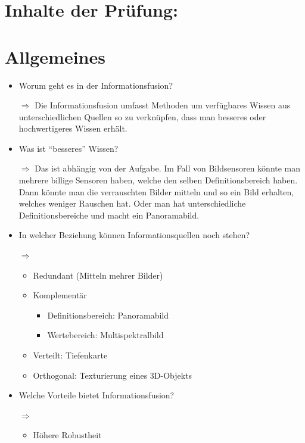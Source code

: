 \documentclass[a4paper]{article}
\begin{document}
\clearpage

\section*{Inhalte der Prüfung:}


    \section{Allgemeines}
    \begin{itemize}
        \item Worum geht es in der Informationsfusion?
        \item[$\Rightarrow$] Die Informationsfusion umfasst Methoden um verfügbares Wissen aus unterschiedlichen Quellen so zu verknüpfen, dass man besseres oder hochwertigeres Wissen erhält.
        \item Was ist \enquote{besseres} Wissen?
        \item[$\Rightarrow$] Das ist abhängig von der Aufgabe. Im Fall von
                             Bildsensoren könnte man mehrere billige Sensoren haben, welche den selben Definitionsbereich haben. Dann könnte man die verrauschten Bilder mitteln und so ein Bild erhalten, welches weniger Rauschen hat. Oder man hat unterschiedliche Definitionsbereiche und macht ein Panoramabild.
        \item In welcher Beziehung können Informationsquellen noch stehen?
        \item[$\Rightarrow$]
        \begin{itemize}
             \item Redundant (Mitteln mehrer Bilder)
             \item Komplementär
             \begin{itemize}
                 \item Definitionsbereich: Panoramabild
                 \item Wertebereich: Multispektralbild
             \end{itemize}
             \item Verteilt: Tiefenkarte
             \item Orthogonal: Texturierung eines 3D-Objekts
         \end{itemize}
         \item Welche Vorteile bietet Informationsfusion?
         \item[$\Rightarrow$]
         \begin{itemize}
             \item Höhere Robustheit

\end{itemize}
\end{itemize}
\end{document}
